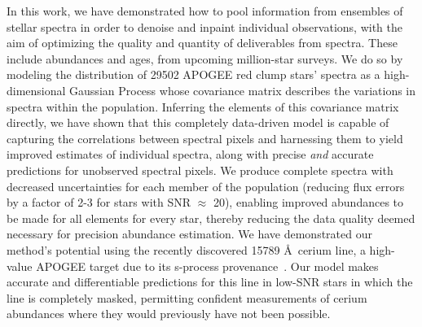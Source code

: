 \documentclass[a4paper,fleqn,usenatbib]{mnras}
\begin{document}
In this work, we have demonstrated how to pool information from ensembles of stellar spectra in order to denoise and inpaint individual observations, with the aim of optimizing the quality and quantity of deliverables from spectra. These include abundances and ages, from upcoming million-star surveys. We do so by modeling the distribution of 29502 APOGEE red clump stars' spectra as a high-dimensional Gaussian Process whose covariance matrix describes the variations in spectra within the population. Inferring the elements of this covariance matrix directly, we have shown that this completely data-driven model is capable of capturing the correlations between spectral pixels and harnessing them to yield improved estimates of individual spectra, along with precise {\it and} accurate predictions for unobserved spectral pixels. We produce complete spectra with decreased uncertainties for each member of the population (reducing flux errors by a factor of 2-3 for stars with SNR $\approx$ 20), enabling improved abundances to be made for all elements for every star, thereby reducing the data quality deemed necessary for precision abundance estimation. We have demonstrated our method's potential using the recently discovered 15789 \AA\ cerium line, a high-value APOGEE target due to its s-process provenance~\citep{Cunha2017}. Our model makes accurate and differentiable predictions for this line in low-SNR stars in which the line is completely masked, permitting confident measurements of cerium abundances where they would previously have not been possible.

\end{document}

